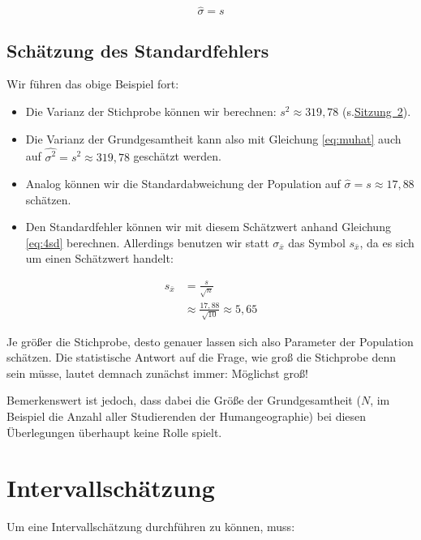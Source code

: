 \documentclass[
  11pt,
  ngerman,
  a4paper,
]{report}
\providecommand{\tightlist}{%
  \setlength{\itemsep}{0pt}\setlength{\parskip}{0pt}}
\begin{document}
\[
\hat{\sigma} = s \label{eq:sigmahat}
\]

\hypertarget{schuxe4tzung-des-standardfehlers}{%
\subsection{Schätzung des Standardfehlers}\label{schuxe4tzung-des-standardfehlers}}

Wir führen das obige Beispiel fort:

\begin{itemize}
\tightlist
\item
  Die Varianz der Stichprobe können wir berechnen: \(s^2\approx319{,}78\) (s.\protect\hyperlink{varianz}{Sitzung~2}).
\item
  Die Varianz der Grundgesamtheit kann also mit Gleichung \eqref{eq:muhat} auch auf \(\hat{\sigma^2}=s^2\approx319{,}78\) geschätzt werden.
\item
  Analog können wir die Standardabweichung der Population auf \(\hat{\sigma}=s\approx17{,}88\) schätzen.
\item
  Den Standardfehler können wir mit diesem Schätzwert anhand Gleichung \eqref{eq:4sd} berechnen. Allerdings benutzen wir statt \(\sigma_{\bar{x}}\) das Symbol \(s_{\bar{x}}\), da es sich um einen Schätzwert handelt:
\end{itemize}

\nopagebreak

\[
\begin{aligned}
s_{\bar{x}} &= \frac{s}{\sqrt{n}}\\[4pt]
&\approx \frac{17{,}88}{\sqrt{10}}\approx5{,}65
\end{aligned}
\]

Je größer die Stichprobe, desto genauer lassen sich also Parameter der Population schätzen. Die statistische Antwort auf die Frage, wie groß die Stichprobe denn sein müsse, lautet demnach zunächst immer: Möglichst groß!

Bemerkenswert ist jedoch, dass dabei die Größe der Grundgesamtheit (\(N\), im Beispiel die Anzahl aller Studierenden der Humangeographie) bei diesen Überlegungen überhaupt keine Rolle spielt.

\hypertarget{intervallschuxe4tzung}{%
\section{Intervallschätzung}\label{intervallschuxe4tzung}}

Um eine Intervallschätzung durchführen zu können, muss:
\end{document}

